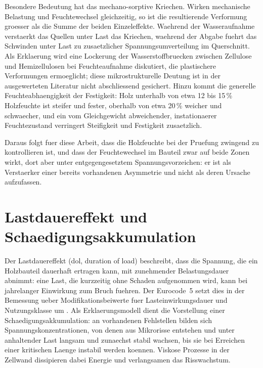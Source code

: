 Besondere Bedeutung hat das mechano-sorptive Kriechen. Wirken mechanische
Belastung und Feuchtewechsel gleichzeitig, so ist die resultierende Verformung
groesser als die Summe der beiden Einzeleffekte. Waehrend der Wasseraufnahme
verstaerkt das Quellen unter Last das Kriechen, waehrend der Abgabe fuehrt das
Schwinden unter Last zu zusaetzlicher Spannungsumverteilung im Querschnitt. Als
Erklaerung wird eine Lockerung der Wasserstoffbruecken zwischen Zellulose und
Hemizellulosen bei Feuchteaufnahme diskutiert, die plastischere Verformungen
ermoeglicht; diese mikrostrukturelle Deutung ist in der ausgewerteten Literatur
nicht abschliessend gesichert. Hinzu kommt die generelle Feuchteabhaengigkeit
der Festigkeit: Holz unterhalb von etwa 12 bis 15\,\% Holzfeuchte ist steifer
und fester, oberhalb von etwa 20\,\% weicher und schwaecher, und ein vom
Gleichgewicht abweichender, instationaerer Feuchtezustand verringert Steifigkeit
und Festigkeit zusaetzlich.

Daraus folgt fuer diese Arbeit, dass die Holzfeuchte bei der Pruefung zwingend
zu kontrollieren ist, und dass der Feuchtewechsel im Bauteil zwar auf beide
Zonen wirkt, dort aber unter entgegengesetztem Spannungsvorzeichen: er ist als
Verstaerker einer bereits vorhandenen Asymmetrie und nicht als deren Ursache
aufzufassen.

\section{Lastdauereffekt und Schaedigungsakkumulation}
\label{sec:dol}

Der Lastdauereffekt (\acrshort{dol}, duration of load) beschreibt, dass die Spannung, die ein Holzbauteil dauerhaft
ertragen kann, mit zunehmender Belastungsdauer abnimmt: eine Last, die
kurzzeitig ohne Schaden aufgenommen wird, kann bei jahrelanger Einwirkung zum
Bruch fuehren. Der Eurocode~5 setzt dies in der Bemessung ueber
Modifikationsbeiwerte fuer Lasteinwirkungsdauer und Nutzungsklasse um
\parencite{ec5}. Als Erklaerungsmodell dient die Vorstellung einer
Schaedigungsakkumulation: an vorhandenen Fehlstellen bilden sich
Spannungskonzentrationen, von denen aus Mikrorisse entstehen und unter
anhaltender Last langsam und zunaechst stabil wachsen, bis sie bei Erreichen
einer kritischen Laenge instabil werden koennen. Viskose Prozesse in der
Zellwand dissipieren dabei Energie und verlangsamen das Risswachstum.

